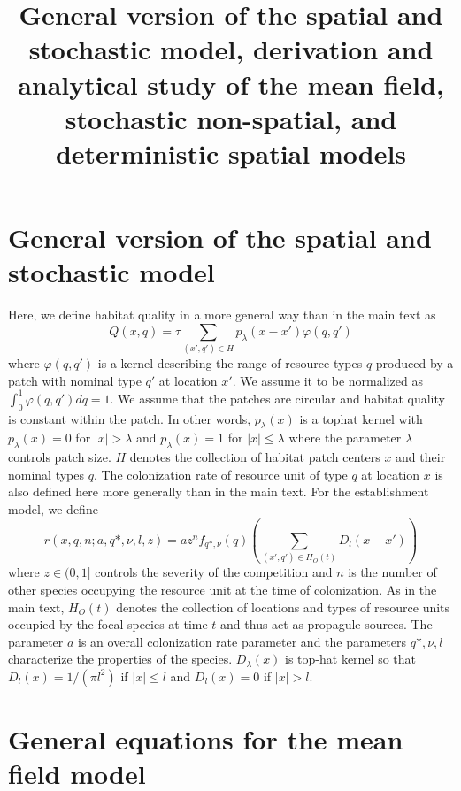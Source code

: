 \documentclass[8pt,a4paper]{article}
\title{General version of the spatial and stochastic model, derivation and analytical study of the mean field, stochastic non-spatial, and deterministic spatial models}
\author{ }
\author{}
\date{\vspace{-5ex}}
\begin{document}

\maketitle

\section{General version of the spatial and stochastic model}
Here, we define habitat quality in a more general way than in the main text as 
\begin{equation*}
Q(x,q) = \tau \sum_{(x' ,q') \in H} p_{\lambda} (x - x') \varphi(q,q')
\end{equation*}
where $\varphi(q,q')$ is a kernel describing the range of resource types $q$ produced by a patch with nominal type $q'$ at location $x'$. 
We assume it to be normalized as $\int_0^1 \varphi(q,q')dq = 1$. 
We assume that the patches are circular and habitat quality is constant within the patch. 
In other words, $p_{\lambda}(x)$ is a tophat kernel with $p_{\lambda}(x) = 0$ for  $| x | >\lambda$  and $p_{\lambda}(x) = 1$  for $|x| \leq \lambda$ where the parameter $\lambda$ controls patch size. 
$H$ denotes the collection of habitat patch centers $x$ and their nominal types $q$.
The colonization rate of resource unit of type $q$ at location $x$ is also defined here more generally than in the main text.
For the establishment model, we define 
\begin{equation*}
r(x,q,n; a, q*,\nu, l, z) = a z^n f_{q*, \nu}  (q)\left( \sum_{(x' ,q') \in H_O(t)} D_l(x - x') \right)
\end{equation*} 
where $z \in (0,1]$ controls the severity of the competition and $n$ is the number of other species occupying the resource unit at the time of colonization.
As in the main text, $H_O(t)$ denotes the collection of locations and types of resource units occupied by the focal species  at time $t$ and thus act as propagule sources.
The parameter $a$ is an overall colonization rate parameter and the parameters $q*,\nu , l$ characterize the properties of the species.
$D_{\lambda} (x)$ is top-hat kernel so that $D_l(x) = 1/(\pi l^2)$ if $|x| \leq l$ and $D_l(x) = 0$ if $|x| >  l$. 


\section{General equations for the mean field model}
\end{document}
